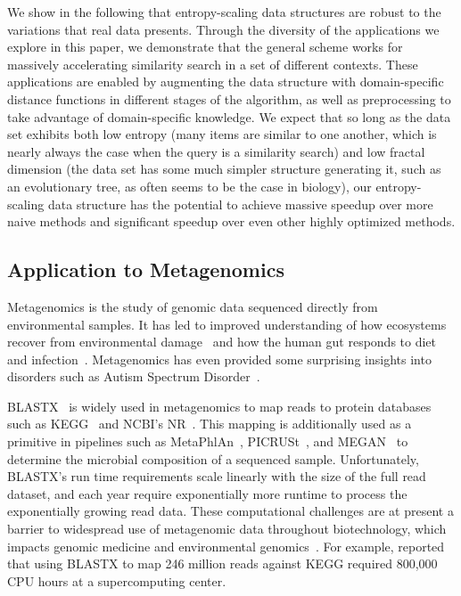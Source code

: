 \documentclass[review,preprint,12pt]{elsarticle}
\renewcommand{\cite}{\citep} %
\theoremstyle{definition}
\theoremstyle{remark}
\numberwithin{equation}{section}
\begin{document}
We show in the following that entropy-scaling data structures are robust to the variations that real data presents.
Through the diversity of the applications we explore in this paper, we demonstrate that the general scheme works for massively accelerating similarity search in a set of different contexts.
These applications are enabled by augmenting the data structure with domain-specific distance functions in different stages of the algorithm, as well as preprocessing to take advantage of domain-specific knowledge.
We expect that so long as the data set exhibits both low entropy (many items are similar to one another, which is nearly always the case when the query is a similarity search) and low fractal dimension (the data set has some much simpler structure generating it, such as an evolutionary tree, as often seems to be the case in biology), our entropy-scaling data structure has the potential to achieve massive speedup over more naive methods and significant speedup over even other highly optimized methods.

\subsection{Application to Metagenomics}

Metagenomics is the study of genomic data sequenced directly from environmental
samples.
It has led to improved understanding of how ecosystems recover
from environmental damage~\cite{tyson2004community} and how the human gut responds 
to diet
and infection~\cite{david2014host}.
Metagenomics has even provided some surprising insights into disorders 
such as Autism Spectrum Disorder~\cite{macfabe2012short}.

BLASTX~\cite{altschul1990basic} is widely used in metagenomics to map
reads to protein databases such as KEGG~\cite{kanehisa2000kegg} and NCBI's 
NR~\cite{sayers2011database}.
This mapping is additionally used as a primitive in pipelines such as MetaPhlAn~\cite{segata2012metagenomic}, 
PICRUSt~\cite{langille2013predictive}, and MEGAN~\cite{huson2011integrative} to
determine the microbial composition of a sequenced sample.
Unfortunately, BLASTX's run time requirements scale linearly with the size of the 
full read dataset, and each year require exponentially more runtime to process 
the exponentially growing read data. 
These computational challenges are at present a barrier to widespread use of 
metagenomic data throughout biotechnology, which impacts genomic medicine and 
environmental genomics~\cite{frank2008gastrointestinal}.
For example, \citet{mackelprang2011metagenomic} reported that using BLASTX to map 246
million reads against KEGG required 800,000 CPU hours at a supercomputing 
center.
\end{document}
